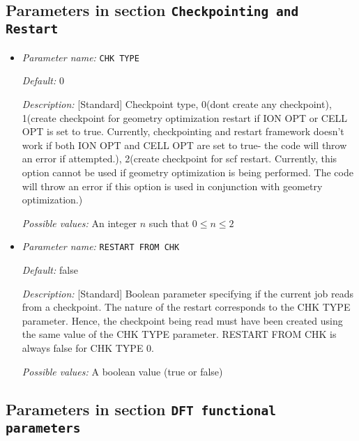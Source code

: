 \subsection{Parameters in section \tt Checkpointing and Restart}
\label{parameters:Checkpointing_20and_20Restart}

\begin{itemize}
\item {\it Parameter name:} {\tt CHK TYPE}
\label{parameters:Checkpointing and Restart/CHK TYPE}
\label{parameters:Checkpointing_20and_20Restart/CHK_20TYPE}




{\it Default:} 0


{\it Description:} [Standard] Checkpoint type, 0(dont create any checkpoint), 1(create checkpoint for geometry optimization restart if ION OPT or CELL OPT is set to true. Currently, checkpointing and restart framework doesn't work if both ION OPT and CELL OPT are set to true- the code will throw an error if attempted.), 2(create checkpoint for scf restart. Currently, this option cannot be used if geometry optimization is being performed. The code will throw an error if this option is used in conjunction with geometry optimization.)


{\it Possible values:} An integer $n$ such that $0\leq n \leq 2$
\item {\it Parameter name:} {\tt RESTART FROM CHK}
\label{parameters:Checkpointing and Restart/RESTART FROM CHK}
\label{parameters:Checkpointing_20and_20Restart/RESTART_20FROM_20CHK}




{\it Default:} false


{\it Description:} [Standard] Boolean parameter specifying if the current job reads from a checkpoint. The nature of the restart corresponds to the CHK TYPE parameter. Hence, the checkpoint being read must have been created using the same value of the CHK TYPE parameter. RESTART FROM CHK is always false for CHK TYPE 0.


{\it Possible values:} A boolean value (true or false)
\end{itemize}

\subsection{Parameters in section \tt DFT functional parameters}
\label{parameters:DFT_20functional_20parameters}

